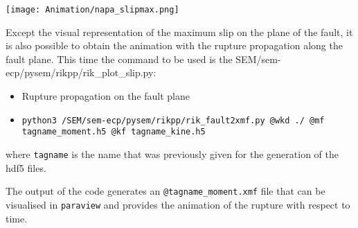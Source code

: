 \begin{center}
\leavevmode
\texttt{[image: Animation/napa\_slipmax.png]} 
\label{fig:slip} 
\vspace{1cm}
\end{center}
\noindent 
Except the visual representation of the maximum slip on the plane of the fault, it is also possible to obtain the animation with the rupture propagation along the fault plane. This time the command to be used is the SEM/sem-ecp/pysem/rikpp/rik\_plot\_slip.py:
\begin{itemize}
    \item Rupture propagation on the fault plane
    \item[] \texttt{python3 /SEM/sem-ecp/pysem/rikpp/rik\_fault2xmf.py @wkd ./ @mf tagname\_moment.h5 @kf tagname\_kine.h5}
\end{itemize}
where \texttt{tagname} is the name that was previously given for the generation of the hdf5 files.

The output of the code generates an \texttt{@tagname\_moment.xmf} file that can be visualised in \texttt{paraview} and provides the animation of the rupture with respect to time. %



 